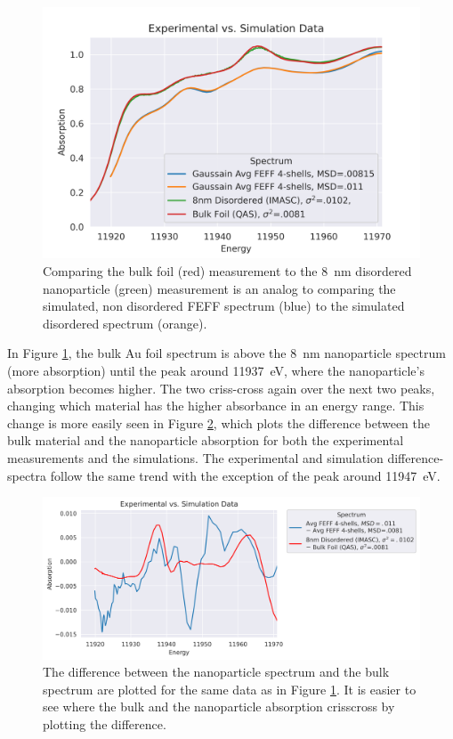 \begin{figure}[h]
	\centering
	\includegraphics[width=.75\linewidth]{Chapters/Figures/updated_bulk_8nm_disorder_experimental_theory_comparison.png}
	\caption[Simulation vs. Experimental]{Comparing the bulk foil (red) measurement to the 8~nm disordered nanoparticle (green) measurement is an analog to comparing the simulated, non disordered FEFF spectrum (blue) to the simulated disordered spectrum (orange).}
	\label{fig:avg-experimental-vs-simulation}
\end{figure}

In Figure \ref{fig:avg-experimental-vs-simulation}, the bulk Au foil spectrum is above the 8~nm nanoparticle spectrum (more absorption) until the peak around 11937~eV, where the nanoparticle's absorption becomes higher. The two criss-cross again over the next two peaks, changing which material has the higher absorbance in an energy range. This change is more easily seen in Figure \ref{fig:avg-experimential-vs-simulation-difference}, which plots the difference between the bulk material and the nanoparticle absorption for both the experimental measurements and the simulations. The experimental and simulation difference-spectra follow the same trend with the exception of the peak around 11947~eV.


\begin{figure}[h!]
	\centering
	\includegraphics[width=\linewidth]{Chapters/Figures/experimental_vs_simulation_delta.png}
	\caption[Bulk-nanoparticle difference: Simulation vs. Experimental data]{The difference between the nanoparticle spectrum and the bulk spectrum are plotted for the same data as in Figure \ref{fig:avg-experimental-vs-simulation}. It is easier to see where the bulk and the nanoparticle absorption crisscross by plotting the difference.}
	\label{fig:avg-experimential-vs-simulation-difference}
\end{figure}

